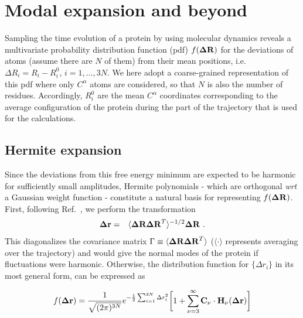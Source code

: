 \documentclass[12pt,article]{iopart}
\begin{document}
\section{Modal expansion and beyond}
Sampling the time evolution of a protein by using molecular dynamics
reveals a multivariate probability distribution function (pdf) $f({\bf\Delta
R})$ for the deviations of atoms (assume there are $N$ of them) from
their mean positions, i.e. $\Delta R_i = R_i - R_i^{0}$,
$i=1,\dots,3N$. We here adopt a coarse-grained representation of this
pdf where only $C^\alpha$ atoms are considered, so that $N$ is also the
number of residues. Accordingly, $R_i^{0}$ are the mean $C^\alpha$
coordinates corresponding to the average configuration of the protein during
the part of the trajectory that is used for the calculations.

\subsection{Hermite expansion}
Since the deviations from this free energy minimum are expected to be
harmonic for sufficiently small amplitudes, Hermite polynomials -
which are orthogonal {\it wrt} a Gaussian weight function - constitute
a natural basis for representing $f({\bf\Delta R})$. First, following
Ref.~\cite{garcia1992large,yogurtcu2009statistical}, we perform the
transformation
\begin{eqnarray}
\label{eq:rotation}
{\bf \Delta r} &=& \langle {\bf\Delta R \Delta R}^T\rangle ^{-1/2} {\bf
  \Delta R}\ .
\end{eqnarray}
This diagonalizes the covariance matrix $ \Gamma\equiv\langle
{\bf\Delta R \Delta R}^T\rangle$ ($\langle \cdot\rangle$
represents averaging over the trajectory) and would give the normal
modes of the protein if fluctuations were harmonic. Otherwise, the
distribution function for $\{\Delta r_i\}$ in its most general form, can
be expressed as~\cite{flory1974moments}
\begin{small}
\begin{equation}
\label{hermite_expansion}
f({\bf\Delta r}) = \frac{1}{\sqrt{(2\pi)^{3N}}} e^{
    -\frac{1}{2}\sum_{i=1}^{3N} \Delta r_i^2} \bigg[ 1 +  \sum_{\nu=3}^\infty
 {\bf C_\nu}\cdot {\bf H}_\nu({\bf \Delta r}) \bigg]
\end{equation}
\end{small}
\end{document}
